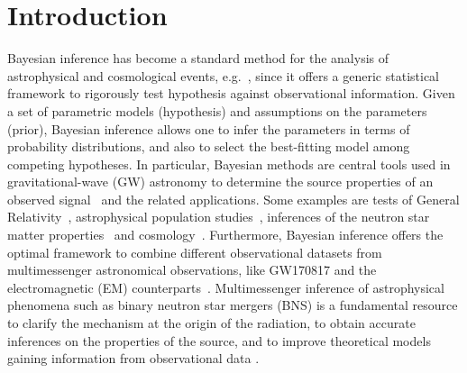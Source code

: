 \documentclass[prd,aps,twocolumn,a4paper,showkeys,nofootinbib,floatfix]{revtex4-1}
\begin{document}

\maketitle

\section{Introduction} 
\label{sec:intro}

Bayesian inference has become a standard method for the analysis of
astrophysical and cosmological
events, e.g.~\cite{LIGOScientific:2018mvr,DelPozzo:2018dpu,Wang:2018lbp,Abbott:2020niy,Hort_a_2020},  
since it offers a generic statistical framework
to rigorously test hypothesis 
against observational information.
Given a set of parametric models (hypothesis) and assumptions on the
parameters (prior), Bayesian inference allows one to infer the
parameters in terms of probability distributions, 
and also to select the best-fitting model 
among competing hypotheses.
In particular, Bayesian methods are central tools used in 
gravitational-wave (GW) astronomy 
to determine the source properties of an observed signal~\cite{Veitch:2009hd,Veitch:2014wba,LIGOScientific:2019hgc} 
and the related applications.
Some examples are 
tests of General Relativity~\cite{LIGOScientific:2019fpa,Breschi:2019wki}, 
astrophysical population studies~\cite{Abbott:2020gyp}, 
inferences of the neutron star matter properties~\cite{Abbott:2018exr}
and cosmology~\cite{Abbott:2017xzu,Abbott:2019yzh}.
Furthermore,
Bayesian inference offers the optimal framework to combine different
observational datasets from multimessenger astronomical observations,
like GW170817 and the electromagnetic (EM) counterparts~\cite{TheLIGOScientific:2017qsa,Monitor:2017mdv,Savchenko:2017ffs,Pian:2017gtc,Smartt:2017fuw,Tanvir:2017pws,Tanaka:2017qxj,Villar:2017wcc}.
Multimessenger inference of astrophysical phenomena 
such as binary neutron star mergers (BNS) is a fundamental resource 
to clarify the mechanism at the origin of the radiation, 
to obtain accurate inferences on the properties of the source, 
and to improve theoretical models
gaining information from observational data \citep[e.g.][]{Radice:2018ozg,Dietrich:2020lps,Breschi:2021tbm}.
\end{document}
